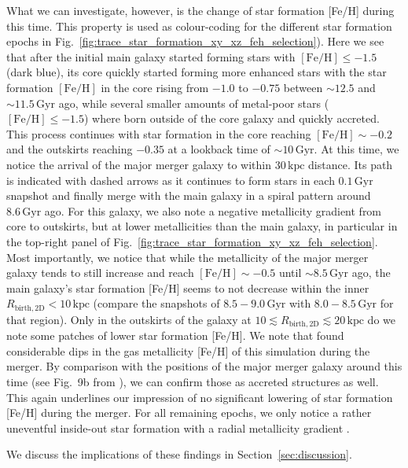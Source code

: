 \documentclass[fleqn,usenatbib]{mnras}
\begin{document}
What we can investigate, however, is the change of star formation [Fe/H] during this time. This property is used as colour-coding for the different star formation epochs in Fig.~\ref{fig:trace_star_formation_xy_xz_feh_selection}). Here we see that after the initial main galaxy started forming stars with $\mathrm{[Fe/H]} \leq -1.5$ (dark blue), its core quickly started forming more enhanced stars with the star formation $\mathrm{[Fe/H]}$ in the core rising from $-1.0$ to $-0.75$ between $\sim 12.5$ and $\sim11.5\,\mathrm{Gyr}$ ago, while several smaller amounts of metal-poor stars ($\mathrm{[Fe/H]} \leq -1.5$) where born outside of the core galaxy and quickly accreted. This process continues with star formation in the core reaching $\mathrm{[Fe/H]} \sim -0.2$ and the outskirts reaching $-0.35$ at a lookback time of $\sim 10\,\mathrm{Gyr}$. At this time, we notice the arrival of the major merger galaxy to within $30\,\mathrm{kpc}$ distance. Its path is indicated with dashed arrows as it continues to form stars in each $0.1\,\mathrm{Gyr}$ snapshot and finally merge with the main galaxy in a spiral pattern around $8.6\,\mathrm{Gyr}$ ago. For this galaxy, we also note a negative metallicity gradient from core to outskirts, but at lower metallicities than the main galaxy, in particular in the top-right panel of Fig.~\ref{fig:trace_star_formation_xy_xz_feh_selection}. Most importantly, we notice that while the metallicity of the major merger galaxy tends to still increase and reach $\mathrm{[Fe/H]} \sim -0.5$ until $\sim 8.5\,\mathrm{Gyr}$ ago, the main galaxy's star formation [Fe/H] seems to not decrease within the inner $R_\mathrm{birth,2D} < 10\,\mathrm{kpc}$ (compare the snapshots of $8.5-9.0\,\mathrm{Gyr}$ with $8.0-8.5\,\mathrm{Gyr}$ for that region). Only in the outskirts of the galaxy at $10 \lesssim R_\mathrm{birth, 2D} \lesssim 20\,\mathrm{kpc}$ do we note some patches of lower star formation [Fe/H]. We note that \citet{Buck2023} found considerable dips in the gas metallicity [Fe/H] of this simulation during the merger. By comparison with the positions of the major merger galaxy around this time (see Fig.~9b from ), we can confirm those as accreted structures as well. This again underlines our impression of no significant lowering of star formation [Fe/H] during the merger. For all remaining epochs, we only notice a rather uneventful inside-out star formation with a radial metallicity gradient \citep[see also][]{Buder2025}.

We discuss the implications of these findings in Section~\ref{sec:discussion}.
\end{document}
